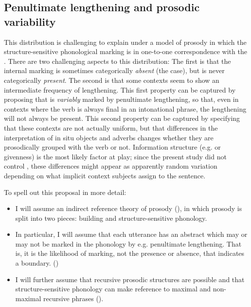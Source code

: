 \documentclass[output=paper,modfonts,nonflat,draftmode]{langsci/langscibook}
\begin{document}
\subsection{Penultimate lengthening and prosodic variability}

This distribution is challenging to explain under a model of prosody in which
the structure-sensitive phonological marking is in one-to-one correspondence
with the . There are two challenging aspects to this
distribution: The first is that the internal marking is sometimes categorically
\textit{absent} (the  case), but is never categorically
\textit{present}. The second is that some contexts seem to show an intermediate
frequency of lengthening. This first property can be captured by proposing that
 is \textit{variably} marked by penultimate lengthening, so
that, even in contexts where the verb is always final in an intonational
phrase, the lengthening will not always be present. This second property can be
captured by specifying that these contexts are not actually uniform, but that
differences in the interpretation of  {in situ} objects and adverbs
changes whether they are prosodically grouped with the verb or not. Information
structure (e.g.  or givenness) is the most likely factor at play; since the
present study did not control , these differences might
appear as apparently random variation depending on what implicit context
subjects assign to the sentence.

To spell out this proposal in more detail:

\begin{itemize}

	\item I will assume an indirect reference theory of prosody
		(\citealt{Selkirk11}),
		in which prosody is split into two pieces:  building
		and structure-sensitive phonology.

	\item In particular, I will assume that each utterance has an abstract
		 which may or may not be marked in the phonology by
		e.g. penultimate lengthening. That is, it is the likelihood of marking,
		not the presence or absence, that indicates a boundary.
		(\citealt{Elfner2016})

	\item I will further assume that recursive prosodic structures are possible
		and that structure-sensitive phonology can make reference to maximal
		and non-maximal recursive phrases (\citealt{ItoMester12}). 
\end{itemize}
\end{document}
